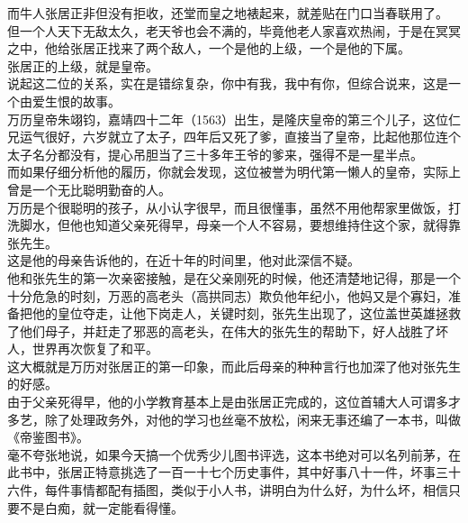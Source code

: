 \begin{multicols}{\theparacolNo}
而牛人张居正非但没有拒收，还堂而皇之地裱起来，就差贴在门口当春联用了。\\

但一个人天下无敌太久，老天爷也会不满的，毕竟他老人家喜欢热闹，于是在冥冥之中，他给张居正找来了两个敌人，一个是他的上级，一个是他的下属。\\

张居正的上级，就是皇帝。\\

说起这二位的关系，实在是错综复杂，你中有我，我中有你，但综合说来，这是一个由爱生恨的故事。\\

万历皇帝朱翊钧，嘉靖四十二年（1563）出生，是隆庆皇帝的第三个儿子，这位仁兄运气很好，六岁就立了太子，四年后又死了爹，直接当了皇帝，比起他那位连个太子名分都没有，提心吊胆当了三十多年王爷的爹来，强得不是一星半点。\\

而如果仔细分析他的履历，你就会发现，这位被誉为明代第一懒人的皇帝，实际上曾是一个无比聪明勤奋的人。\\

万历是个很聪明的孩子，从小认字很早，而且很懂事，虽然不用他帮家里做饭，打洗脚水，但他也知道父亲死得早，母亲一个人不容易，要想维持住这个家，就得靠张先生。\\

这是他的母亲告诉他的，在近十年的时间里，他对此深信不疑。\\

他和张先生的第一次亲密接触，是在父亲刚死的时候，他还清楚地记得，那是一个十分危急的时刻，万恶的高老头（高拱同志）欺负他年纪小，他妈又是个寡妇，准备把他的皇位夺走，让他下岗走人，关键时刻，张先生出现了，这位盖世英雄拯救了他们母子，并赶走了邪恶的高老头，在伟大的张先生的帮助下，好人战胜了坏人，世界再次恢复了和平。\\

这大概就是万历对张居正的第一印象，而此后母亲的种种言行也加深了他对张先生的好感。\\

由于父亲死得早，他的小学教育基本上是由张居正完成的，这位首辅大人可谓多才多艺，除了处理政务外，对他的学习也丝毫不放松，闲来无事还编了一本书，叫做《帝鉴图书》。\\

毫不夸张地说，如果今天搞一个优秀少儿图书评选，这本书绝对可以名列前茅，在此书中，张居正特意挑选了一百一十七个历史事件，其中好事八十一件，坏事三十六件，每件事情都配有插图，类似于小人书，讲明白为什么好，为什么坏，相信只要不是白痴，就一定能看得懂。\\


\end{multicols}
